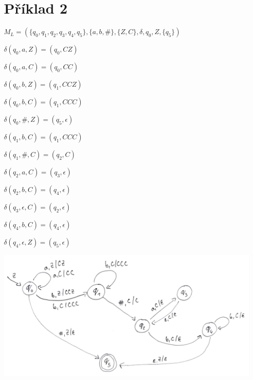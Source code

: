 \documentclass[11pt, a4paper, titlepage]{article}
\begin{document}
\newpage


\section*{Příklad 2}

$M_L=(\{q_0, q_1, q_2, q_3, q_4, q_5\}, \{a, b, \#\}, \{Z, C\}, \delta, q_0, Z, \{q_5\})$

\begin{multicols}{3}

    $\delta(q_0, a, Z)=(q_0, CZ)$

    $\delta(q_0, a, C)=(q_0, CC)$

    $\delta(q_0, b, Z)=(q_1, CCZ)$

    $\delta(q_0, b, C)=(q_1, CCC)$

    $\delta(q_0, \#, Z)=(q_5, \epsilon)$

    $\delta(q_1, b, C)=(q_1, CCC)$

    $\delta(q_1, \#, C)=(q_2, C)$

    $\delta(q_2, a, C)=(q_3, \epsilon)$

    $\delta(q_2, b, C)=(q_4, \epsilon)$

    $\delta(q_3, \epsilon, C)=(q_2, \epsilon)$

    $\delta(q_4, b, C)=(q_4, \epsilon)$

    $\delta(q_4, \epsilon, Z)=(q_5, \epsilon)$

\end{multicols}

\bigskip

\includegraphics[page=1,scale=0.6]{images/priklad2-automat.pdf}

\newpage

\end{document}

